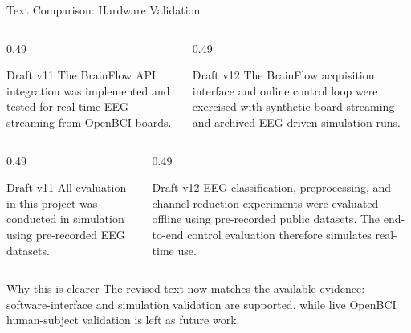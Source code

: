 \documentclass[UTF8,aspectratio=169,11pt]{ctexbeamer}
\begin{document}
\begin{frame}[t]{Text Comparison: Hardware Validation}
\scriptsize

    \begin{columns}[T,onlytextwidth]
        \begin{column}{0.49\textwidth}
            \begin{alertblock}{Draft v11}
                The BrainFlow API integration was implemented and tested for real-time EEG streaming from OpenBCI boards.
            \end{alertblock}
        \end{column}
        \begin{column}{0.49\textwidth}
            \begin{block}{Draft v12}
                The BrainFlow acquisition interface and online control loop were exercised with synthetic-board streaming and archived EEG-driven simulation runs.
            \end{block}
        \end{column}
    \end{columns}

    \vspace{0.5em}

    \begin{columns}[T,onlytextwidth]
        \begin{column}{0.49\textwidth}
            \begin{alertblock}{Draft v11}
                All evaluation in this project was conducted in simulation using pre-recorded EEG datasets.
            \end{alertblock}
        \end{column}
        \begin{column}{0.49\textwidth}
            \begin{block}{Draft v12}
                EEG classification, preprocessing, and channel-reduction experiments were evaluated offline using pre-recorded public datasets. The end-to-end control evaluation therefore simulates real-time use.
            \end{block}
        \end{column}
    \end{columns}

    \vfill

    \begin{block}{Why this is clearer}
        The revised text now matches the available evidence: software-interface and simulation validation are supported, while live OpenBCI human-subject validation is left as future work.
    \end{block}

\end{frame}
\end{document}
